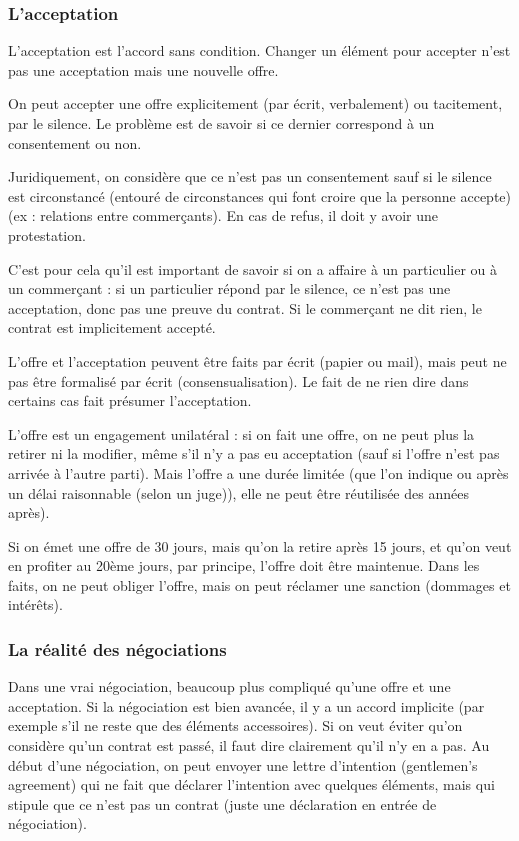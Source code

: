		
			\subsubsection{L'acceptation}
		
			L'acceptation est l'accord sans condition. Changer un élément pour accepter n'est pas une acceptation mais une nouvelle offre.
		
			On peut accepter une offre explicitement (par écrit, verbalement) ou tacitement, par le silence. Le problème est de savoir si ce dernier correspond à un consentement ou non. 
		
			Juridiquement, on considère que ce n'est pas un consentement sauf si le silence est circonstancé (entouré de circonstances qui font croire que la personne accepte) (ex : relations entre commerçants). En cas de refus, il doit y avoir une protestation.
		
			C'est pour cela qu'il est important de savoir si on a affaire à un particulier ou à un commerçant : si un particulier répond par le silence, ce n'est pas une acceptation, donc pas une preuve du contrat. Si le commerçant ne dit rien, le contrat est implicitement accepté.
		
		
			L'offre et l'acceptation peuvent être faits par écrit (papier ou mail), mais peut ne pas être formalisé par écrit (consensualisation). Le fait de ne rien dire dans certains cas fait présumer l'acceptation.
		
			L'offre est un engagement unilatéral : si on fait une offre, on ne peut plus la retirer ni la modifier, même s'il n'y a pas eu acceptation (sauf si l'offre n'est pas arrivée à l'autre parti). Mais l'offre a une durée limitée (que l'on indique ou après un délai raisonnable (selon un juge)), elle ne peut être réutilisée des années après).
	
			Si on émet une offre de 30 jours, mais qu'on la retire après 15 jours, et qu'on veut en profiter au 20ème jours, par principe, l'offre doit être maintenue. Dans les faits, on ne peut obliger l'offre, mais on peut réclamer une sanction (dommages et intérêts).
		
			\subsubsection{La réalité des négociations}		
				
			Dans une vrai négociation, beaucoup plus compliqué qu'une offre et une acceptation. Si la négociation est bien avancée, il y a un accord implicite (par exemple s'il ne reste que des éléments accessoires). Si on veut éviter qu'on considère qu'un contrat est passé, il faut dire clairement qu'il n'y en a pas. Au début d'une négociation, on peut envoyer une lettre d'intention (gentlemen's agreement) qui ne fait que déclarer l'intention avec quelques éléments, mais qui stipule que ce n'est pas un contrat (juste une déclaration en entrée de négociation).
		
